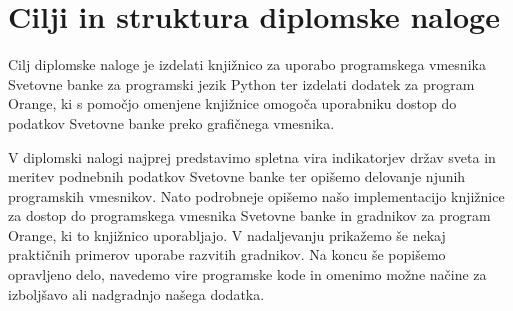 \section{Cilji in struktura diplomske naloge}

Cilj diplomske naloge je izdelati knjižnico za uporabo programskega vmesnika
Svetovne banke za programski jezik Python ter izdelati dodatek za program Orange, ki s pomočjo omenjene
knjižnice omogoča uporabniku dostop do podatkov Svetovne banke preko
grafičnega vmesnika.

V diplomski nalogi najprej predstavimo spletna vira indikatorjev
držav sveta in meritev podnebnih podatkov Svetovne banke ter
opišemo delovanje njunih programskih vmesnikov.
Nato podrobneje opišemo našo implementacijo knjižnice za dostop do
programskega vmesnika Svetovne banke in gradnikov za program Orange, ki to
knjižnico uporabljajo. V nadaljevanju prikažemo še nekaj praktičnih 
primerov uporabe razvitih gradnikov. Na koncu še popišemo opravljeno 
delo, navedemo vire programske kode in omenimo možne načine za izboljšavo ali 
nadgradnjo našega dodatka.














